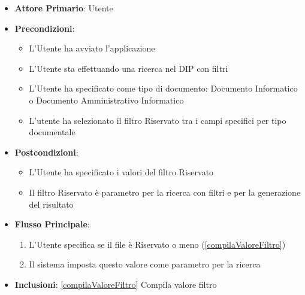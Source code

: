 \begin{itemize}
      \item \textbf{Attore Primario}: Utente
      \item \textbf{Precondizioni}: 
      \begin{itemize}
            \item L'Utente ha avviato l'applicazione
            \item L'Utente sta effettuando una ricerca nel DIP con filtri
            \item L'Utente ha specificato come tipo di documento: Documento Informatico o Documento Amministrativo Informatico
            \item L'utente ha selezionato il filtro Riservato tra i campi specifici per tipo documentale
      \end{itemize}
      \item \textbf{Postcondizioni}: 
      \begin{itemize}
            \item L'Utente ha specificato i valori del filtro Riservato
            \item Il filtro Riservato è parametro per la ricerca con filtri e per la generazione del risultato
      \end{itemize}
      \item \textbf{Flusso Principale}:
      \begin{enumerate}
            \item L'Utente specifica se il file è Riservato o meno (\ref{compilaValoreFiltro})
            \item Il sistema imposta questo valore come parametro per la ricerca
      \end{enumerate}
      \item \textbf{Inclusioni}: \ref{compilaValoreFiltro} Compila valore filtro
\end{itemize}

